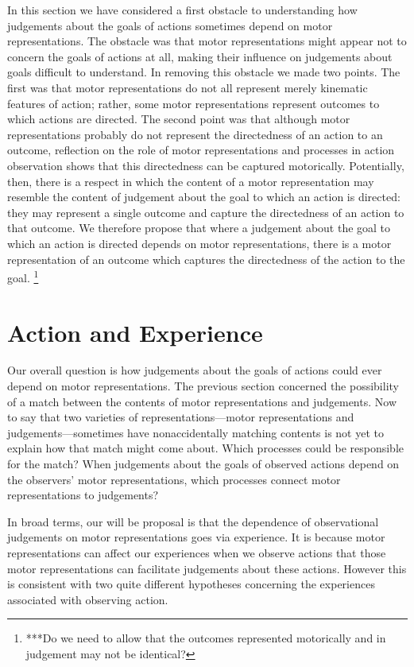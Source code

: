 \documentclass[12pt,\papersize]{extarticle}
\begin{document}
In this section we have considered a first obstacle to understanding how judgements about the goals of actions sometimes depend on motor representations.  The obstacle was that motor representations might appear not to concern the goals of actions at all, making their influence on judgements about goals difficult to understand.  In removing this obstacle we made two points.  The first was that motor representations do not all represent merely kinematic features of action; rather, some motor representations represent outcomes to which actions are directed.  The second point was that although motor representations probably do not represent the directedness of an action to an outcome, reflection on the role of motor representations and processes in action observation shows that this directedness can be captured motorically.  Potentially, then, there is a respect in which the content of a motor representation may resemble the content of judgement about the goal to which an action is directed: they may represent a single outcome and capture the directedness of an action to that outcome.  
We therefore propose that where a judgement about the goal to which an action is directed depends on motor representations, there is a motor representation of an outcome which captures the directedness of the action to the goal.%
\footnote{
***Do we need to allow that the outcomes represented motorically and in judgement may not be identical?
}


\section{Action and Experience}
\label{sec:processes}
Our overall question is how judgements about the goals of actions could ever depend on motor representations.  The previous section concerned the possibility of a match between the contents of motor representations and judgements.  Now to say that two varieties of representations---motor representations and judgements---sometimes have nonaccidentally matching contents is not yet to explain how that match might come about.  Which processes could be responsible for the match?  When judgements about the goals of observed actions depend on the observers' motor representations, which processes connect motor representations to judgements?  

In broad terms, our will be proposal is that the dependence of observational judgements on motor representations goes via experience.  It is because motor representations can affect our experiences when we observe actions that those motor representations can facilitate judgements about these actions.  However this is consistent with two quite different hypotheses concerning the experiences associated with observing action.
\end{document}
